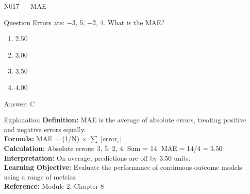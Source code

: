 \documentclass[aspectratio=169,8pt]{beamer}
\begin{document}
	\begin{frame}{N017 --- MAE}
		\begin{block}{Question}
			Errors are: $-$3, 5, $-$2, 4. What is the MAE?
			\begin{enumerate}
				\item 2.50
				\item 3.00
				\item 3.50
				\item 4.00
			\end{enumerate}
		\end{block}
		\begin{exampleblock}{Answer: C}\end{exampleblock}
		\begin{block}{Explanation}
			\textbf{Definition:} MAE is the average of absolute errors, treating positive and negative errors equally.\\
			\textbf{Formula:} MAE = (1/N) $\times$ $\sum$ $|$error$_{i}$$|$\\
			\textbf{Calculation:} Absolute errors: 3, 5, 2, 4. Sum = 14. MAE = 14/4 = 3.50\\
			\textbf{Interpretation:} On average, predictions are off by 3.50 units.\\
			\textbf{Learning Objective:} Evaluate the performance of continuous-outcome models using a range of metrics.\\
			\textbf{Reference:} Module 2, Chapter 8
		\end{block}
	\end{frame}
	
\end{document}
